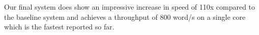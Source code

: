 \documentclass[11pt,a4paper]{article}
\begin{document}
Our final system does show an impressive increase in speed of 110x compared to the baseline system and achieves a throughput of 800 word/s on a single core which is the fastest reported so far.

\newpage

%

%
%


\end{document}
